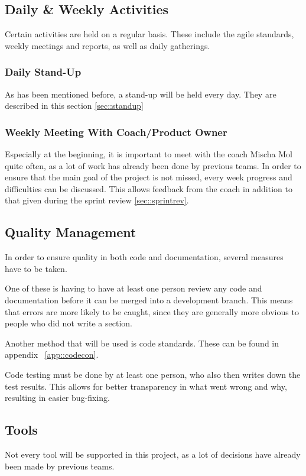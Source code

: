 \subsection{Daily \& Weekly Activities}
Certain activities are held on a regular basis.
These include the agile standards, weekly meetings and reports, as well as daily gatherings.

\subsubsection{Daily Stand-Up}
As has been mentioned before, a stand-up will be held every day.
They are described in this section \ref{sec::standup}
\subsubsection{Weekly Meeting With Coach/Product Owner}
Especially at the beginning, it is important to meet with the coach Mischa Mol quite often, as a lot of work has already been done by previous teams.
In order to ensure that the main goal of the project is not missed, every week progress and difficulties can be discussed.
This allows feedback from the coach in addition to that given during the sprint review \ref{sec::sprintrev}.

\subsection{Quality Management}
In order to ensure quality in both code and documentation, several measures have to be taken.

One of these is having to have at least one person review any code and documentation before it can be merged into a development branch.
This means that errors are more likely to be caught, since they are generally more obvious to people who did not write a section.

Another method that will be used is code standards. 
These can be found in appendix ~\ref{app::codecon}.

Code testing must be done by at least one person, who also then writes down the test results.
This allows for better transparency in what went wrong and why, resulting in easier bug-fixing.
\newpage

\subsection{Tools}
Not every tool will be supported in this project, as a lot of decisions have already been made by previous teams.


